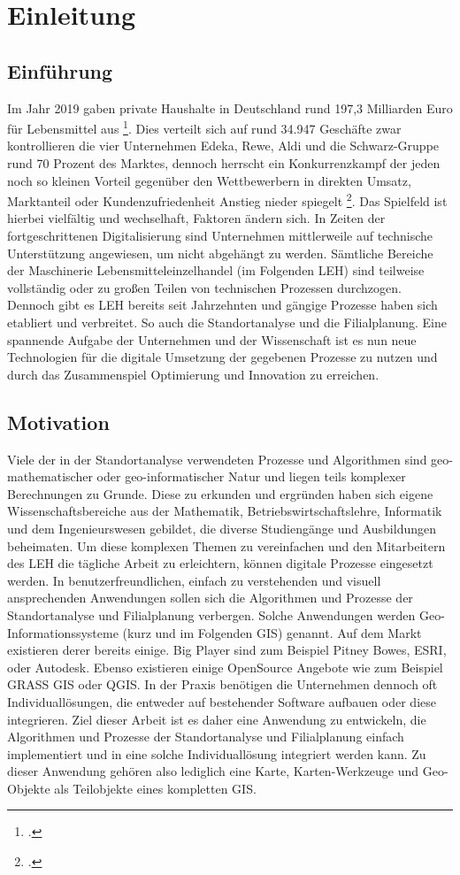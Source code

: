 \chapter{Einleitung}
\section{Einführung}
Im Jahr 2019 gaben private Haushalte in Deutschland rund 197,3 Milliarden Euro für Lebensmittel aus \footcite{statista_konsumausgaben}.
Dies verteilt sich auf rund 34.947 Geschäfte zwar kontrollieren die vier Unternehmen Edeka, Rewe, Aldi und die Schwarz-Gruppe rund 70 Prozent des Marktes, dennoch herrscht ein Konkurrenzkampf der jeden noch so kleinen Vorteil gegenüber den Wettbewerbern in direkten Umsatz, Marktanteil oder Kundenzufriedenheit Anstieg nieder spiegelt \footcite{statista_lebensmittel-discounter}.
Das Spielfeld ist hierbei vielfältig und wechselhaft, Faktoren ändern sich. In Zeiten der fortgeschrittenen Digitalisierung sind Unternehmen mittlerweile auf technische Unterstützung angewiesen, um nicht abgehängt zu werden. Sämtliche Bereiche der Maschinerie Lebensmitteleinzelhandel (im Folgenden LEH) sind teilweise vollständig oder zu großen Teilen von technischen Prozessen durchzogen.
Dennoch gibt es LEH bereits seit Jahrzehnten und gängige Prozesse haben sich etabliert und verbreitet. So auch die Standortanalyse und die Filialplanung. Eine spannende Aufgabe der Unternehmen und der Wissenschaft ist es nun neue Technologien für die digitale Umsetzung der gegebenen Prozesse zu nutzen und durch das Zusammenspiel Optimierung und Innovation zu erreichen. 

\section{Motivation}
Viele der in der Standortanalyse verwendeten Prozesse und Algorithmen sind geo-mathematischer oder geo-informatischer Natur und liegen teils komplexer Berechnungen zu Grunde.
Diese zu erkunden und ergründen haben sich eigene Wissenschaftsbereiche aus der Mathematik, Betriebswirtschaftslehre, Informatik und dem Ingenieurswesen gebildet, die diverse Studiengänge und Ausbildungen beheimaten.
Um diese komplexen Themen zu vereinfachen und den Mitarbeitern des LEH die tägliche Arbeit zu erleichtern, können digitale Prozesse eingesetzt werden.
In benutzerfreundlichen, einfach zu verstehenden und visuell ansprechenden Anwendungen sollen sich die Algorithmen und Prozesse der Standortanalyse und Filialplanung verbergen. 
Solche Anwendungen werden Geo-Informationssysteme (kurz und im Folgenden GIS) genannt.
Auf dem Markt existieren derer bereits einige.
Big Player sind zum Beispiel Pitney Bowes, ESRI, oder Autodesk.
Ebenso existieren einige OpenSource Angebote wie zum Beispiel GRASS GIS oder QGIS.
In der Praxis benötigen die Unternehmen dennoch oft Individuallösungen, die entweder auf bestehender Software aufbauen oder diese integrieren.
Ziel dieser Arbeit ist es daher eine Anwendung zu entwickeln, die Algorithmen und Prozesse der Standortanalyse und Filialplanung einfach implementiert und in eine solche Individuallösung integriert werden kann.
Zu dieser Anwendung gehören also lediglich eine Karte, Karten-Werkzeuge und Geo-Objekte als Teilobjekte eines kompletten GIS.


